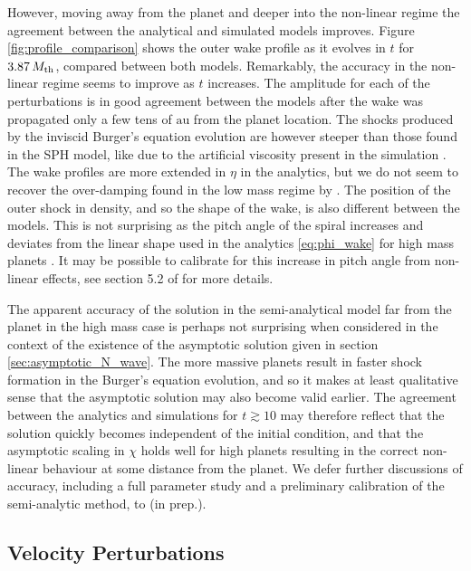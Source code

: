 However, moving away from the planet and deeper into the non-linear regime the agreement between the analytical and simulated models improves.
Figure \ref{fig:profile_comparison} shows the outer wake profile as it evolves in $t$ for $3.87 \, M_{\rm th}$, compared between both models.
Remarkably, the accuracy in the non-linear regime seems to improve as $t$ increases.
The amplitude for each of the perturbations is in good agreement between the models after the wake was propagated only a few tens of $\mathrm{au}$ from the planet location.
The shocks produced by the inviscid Burger's equation evolution are however steeper than those found in the SPH model, like due to the artificial viscosity present in the simulation \citep{lodato2010}.
The wake profiles are more extended in $\eta$ in the analytics, but we do not seem to recover the over-damping found in the low mass regime by \citet{cimerman2021}.
The position of the outer shock in density, and so the shape of the wake, is also different between the models.
This is not surprising as the pitch angle of the spiral increases and deviates from the linear shape used in the analytics \ref{eq:phi_wake} for high mass planets \cite{zhu2015}.
It may be possible to calibrate for this increase in pitch angle from non-linear effects, see section 5.2 of \citet{cimerman2021} for more details.

The apparent accuracy of the solution in the semi-analytical model far from the planet in the high mass case is perhaps not surprising when considered in the context of the existence of the asymptotic solution given in section \ref{sec:asymptotic_N_wave}.
The more massive planets result in faster shock formation in the Burger's equation evolution, and so it makes at least qualitative sense that the asymptotic solution may also become valid earlier.
The agreement between the analytics and simulations for $t \gtrsim 10$ may therefore reflect that the solution quickly becomes independent of the initial condition, and that the asymptotic scaling in $\chi$ holds well for high planets resulting in the correct non-linear behaviour at some distance from the planet.
We defer further discussions of accuracy, including a full parameter study and a preliminary calibration of the semi-analytic method, to \citeauthor{fasanoinprep.} (in prep.).

\subsection{Velocity Perturbations} \label{sec:velocity_perts}

